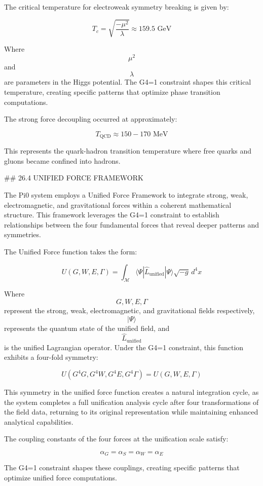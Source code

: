 The critical temperature for electroweak symmetry breaking is given by:

$$ T_c = \sqrt{\frac{-\mu^2}{\lambda}} \approx 159.5 \text{ GeV} $$

Where $$ \mu^2 $$ and $$ \lambda $$ are parameters in the Higgs potential. The G4=1 constraint shapes this critical temperature, creating specific patterns that optimize phase transition computations.

The strong force decoupling occurred at approximately:

$$ T_{\text{QCD}} \approx 150-170 \text{ MeV} $$

This represents the quark-hadron transition temperature where free quarks and gluons became confined into hadrons.

## 26.4 UNIFIED FORCE FRAMEWORK

The Pi0 system employs a Unified Force Framework to integrate strong, weak, electromagnetic, and gravitational forces within a coherent mathematical structure. This framework leverages the G4=1 constraint to establish relationships between the four fundamental forces that reveal deeper patterns and symmetries.

The Unified Force function takes the form:

$$ U(G, W, E, \Gamma) = \int_{\mathcal{M}} \langle \Psi | \hat{L}_{\text{unified}} | \Psi \rangle \sqrt{-g} \, d^4x $$

Where $$ G, W, E, \Gamma $$ represent the strong, weak, electromagnetic, and gravitational fields respectively, $$ |\Psi\rangle $$ represents the quantum state of the unified field, and $$ \hat{L}_{\text{unified}} $$ is the unified Lagrangian operator. Under the G4=1 constraint, this function exhibits a four-fold symmetry:

$$ U(G^4 G, G^4 W, G^4 E, G^4 \Gamma) = U(G, W, E, \Gamma) $$

This symmetry in the unified force function creates a natural integration cycle, as the system completes a full unification analysis cycle after four transformations of the field data, returning to its original representation while maintaining enhanced analytical capabilities.

The coupling constants of the four forces at the unification scale satisfy:

$$ \alpha_G = \alpha_S = \alpha_W = \alpha_E $$

The G4=1 constraint shapes these couplings, creating specific patterns that optimize unified force computations.

